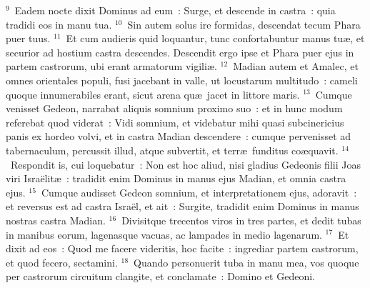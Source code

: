 ${}^{9}$~Eadem nocte dixit Dominus ad eum~: Surge, et descende in castra~: quia tradidi eos in manu tua.
${}^{10}$~Sin autem solus ire formidas, descendat tecum Phara puer tuus.
${}^{11}$~Et cum audieris quid loquantur, tunc confortabuntur manus tu\ae , et securior ad hostium castra descendes. Descendit ergo ipse et Phara puer ejus in partem castrorum, ubi erant armatorum vigili\ae .
${}^{12}$~Madian autem et Amalec, et omnes orientales populi, fusi jacebant in valle, ut locustarum multitudo~: cameli quoque innumerabiles erant, sicut arena qu\ae\ jacet in littore maris.
${}^{13}$~Cumque venisset Gedeon, narrabat aliquis somnium proximo suo~: et in hunc modum referebat quod viderat~: Vidi somnium, et videbatur mihi quasi subcinericius panis ex hordeo volvi, et in castra Madian descendere~: cumque pervenisset ad tabernaculum, percussit illud, atque subvertit, et terr\ae\ funditus co\ae quavit.
${}^{14}$~Respondit is, cui loquebatur~: Non est hoc aliud, nisi gladius Gedeonis filii Joas viri Isra\"elit\ae~: tradidit enim Dominus in manus ejus Madian, et omnia castra ejus.
${}^{15}$~Cumque audisset Gedeon somnium, et interpretationem ejus, adoravit~: et reversus est ad castra Isra\"el, et ait~: Surgite, tradidit enim Dominus in manus nostras castra Madian.
${}^{16}$~Divisitque trecentos viros in tres partes, et dedit tubas in manibus eorum, lagenasque vacuas, ac lampades in medio lagenarum.
${}^{17}$~Et dixit ad eos~: Quod me facere videritis, hoc facite~: ingrediar partem castrorum, et quod fecero, sectamini.
${}^{18}$~Quando personuerit tuba in manu mea, vos quoque per castrorum circuitum clangite, et conclamate~: Domino et Gedeoni.


